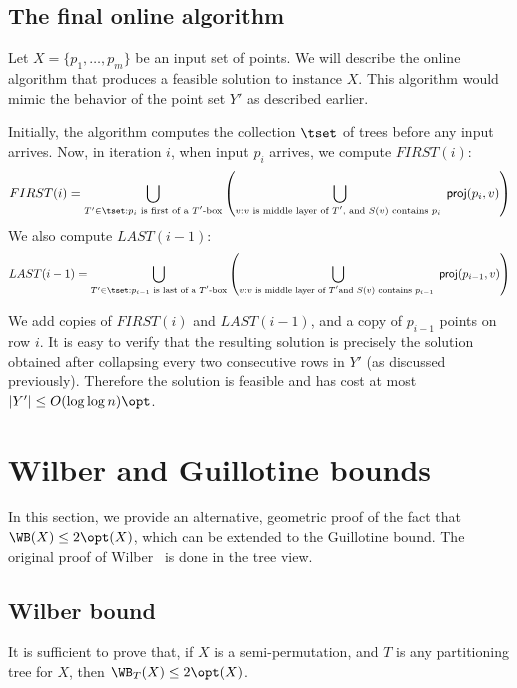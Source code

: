 \fi

\subsection{The final online algorithm} \label{subsec: online final}
Let $X=\{p_1,\ldots, p_m\}$ be an input set of points. 
We will describe the online algorithm that produces a feasible solution to instance $X$. 
This algorithm would mimic the behavior of the point set $Y'$ as described earlier. 

Initially, the algorithm computes the collection $\tset$ of trees before any input arrives. 
Now, in iteration $i$, when input $p_i$ arrives, we compute $FIRST(i)$: 
\[FIRST(i) = \bigcup_{T' \in \tset: p_i \text{ is first of a $T'$-box}} \left( \bigcup_{v:\text{$v$ is middle layer of $T'$, and $S(v)$ contains $p_i$ }} {\sf proj}(p_i, v)\right) \] 
We also compute $LAST(i-1)$: 
\[LAST(i-1)= \bigcup_{T' \in \tset: p_{i-1} \text{ is last of a $T'$-box}} \left( \bigcup_{v:\text{$v$ is middle layer of $T'$}\\ \text{and $S(v)$ contains $p_{i-1}$ }} {\sf proj}(p_{i-1}, v)\right)\]
%

We add copies of $FIRST(i)$ and $LAST(i-1)$, and a copy of $p_{i-1}$ points on row $i$. 
It is easy to verify that the resulting solution is precisely the solution obtained after collapsing every two consecutive rows in $Y'$ (as discussed previously). Therefore the solution is feasible and has cost at most $|Y'| \leq O(\log \log n) \opt$.   



%

%
 
%
%
%
%
    
%
%

%

%

\section{Wilber and Guillotine bounds} 
\label{sec:direct WB LB}

In this section, we provide an alternative, geometric proof of the fact that $\WB(X) \leq 2 \opt(X)$, which can be extended to the Guillotine bound. 
The original proof of Wilber~\cite{wilber} is done in the tree view. 
%

\subsection{Wilber bound} 
It is sufficient to prove that, if $X$ is a semi-permutation, and $T$ is any partitioning tree for $X$, then $\WB_T(X) \leq 2\opt(X)$. %


